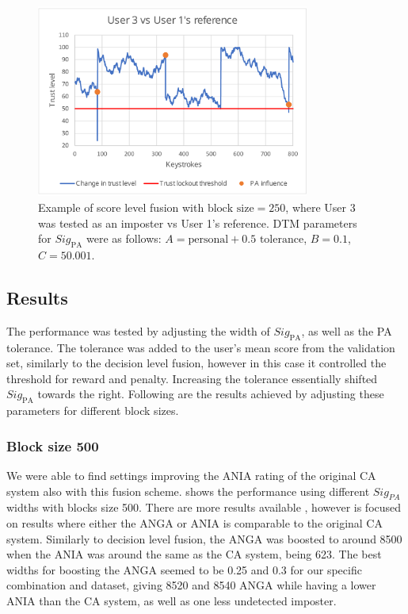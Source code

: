 \begin{figure}[ht]
    \centering
    \includegraphics[width=0.8\textwidth]{figures/trustProgressScoreLevel.pdf}
    \caption{Example of score level fusion with $\text{block size} = 250$, where User 3 was tested as an imposter vs User 1's reference. DTM parameters for $\textit{Sig}_{\text{PA}}$ were as follows: $A = \text{personal} + 0.5 \text{ tolerance}$, $B = 0.1$, $C = 50.001$.}
    \label{fig:trustProgressScoreLevel}
\end{figure}

\subsection{Results}
\label{sec:analysis-score-lvl-results}
The performance was tested by adjusting the width of $\textit{Sig}_{\text{PA}}$, as well as the PA tolerance.
The tolerance was added to the user's mean score from the validation set, similarly to the decision level fusion, however in this case it controlled the threshold for reward and penalty.
Increasing the tolerance essentially shifted $\textit{Sig}_{\text{PA}}$ towards the right.
Following are the results achieved by adjusting these parameters for different block sizes.

\subsubsection{Block size 500}
We were able to find settings improving the ANIA rating of the original CA system also with this fusion scheme. %
 shows the performance using different $\textit{Sig}_{\textit{PA}}$ widths with blocks size 500.
There are more results available , however  is focused on results where either the ANGA or ANIA is comparable to the original CA system.
Similarly to decision level fusion, the ANGA was boosted to around 8500 when the ANIA was around the same as the CA system, being 623.
The best widths for boosting the ANGA seemed to be 0.25 and 0.3 for our specific combination and dataset, giving 8520 and 8540 ANGA while having a lower ANIA than the CA system, as well as one less undetected imposter.



